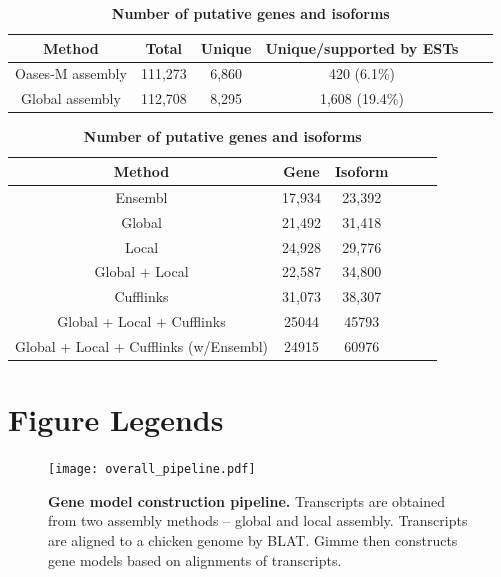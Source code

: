 \documentclass[10pt]{article}
\begin{document}
\begin{table}[!ht]
\caption{
\bf{Number of total and unique splice junctions}}
\begin{tabular}{cccccc}
\hline
Method& Total & Unique & Unique/supported by ESTs \\ 
\hline
Oases-M assembly & 111,273 & 6,860 & 420 (6.1\%) \\
Global assembly & 112,708 & 8,295 & 1,608 (19.4\%) \\
\hline
\end{tabular}
\label{Oases-M}

\caption{
\bf{Number of putative genes and isoforms}}
\begin{tabular}{cccccc}
\hline
Method& Gene & Isoform \\ 
\hline
Ensembl & 17,934 & 23,392 \\
Global & 21,492 & 31,418 \\
Local & 24,928 & 29,776 \\
Global + Local & 22,587 & 34,800 \\
Cufflinks & 31,073 & 38,307 \\
Global + Local + Cufflinks & 25044 & 45793 \\
Global + Local + Cufflinks (w/Ensembl) & 24915 & 60976 \\
\hline
\end{tabular}
\label{genes_transcripts}

\end{table}

\section*{Figure Legends}
\begin{figure}[!ht]
\begin{center}
\texttt{[image: overall\_pipeline.pdf]}
\end{center}
\caption{
{\bf Gene model construction pipeline.} Transcripts are obtained from two
assembly methods -- global and local assembly.  Transcripts are aligned to a
chicken genome by BLAT\@. Gimme then constructs gene models based on alignments
of transcripts.
}
\label{overall_pipeline}
\end{figure}
\end{document}
